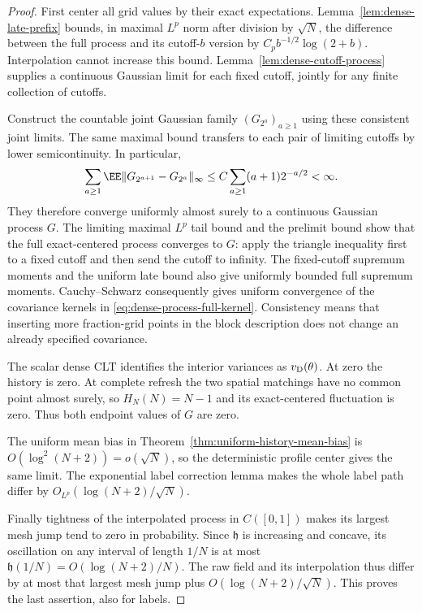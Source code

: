 \documentclass[11pt,letterpaper]{article}
\begin{document}
\begin{proof}
First center all grid values by their exact expectations.
Lemma~\ref{lem:dense-late-prefix} bounds, in maximal
$L^p$ norm after division by $\sqrt N$, the difference
between the full process and its cutoff-$b$ version by
$C_p b^{-1/2}\log(2+b)$.
Interpolation cannot increase this bound.
Lemma~\ref{lem:dense-cutoff-process} supplies a continuous
Gaussian limit for each fixed cutoff, jointly for any
finite collection of cutoffs.

Construct the countable joint Gaussian family
$(G_{2^a})_{a\ge1}$ using these consistent joint limits.
The same maximal bound transfers to each pair of
limiting cutoffs by lower semicontinuity. In particular,
\[
 \sum_{a\ge1}\EE\|G_{2^{a+1}}-G_{2^a}\|_\infty
                          \le C\sum_{a\ge1}(a+1)2^{-a/2}<\infty.
\]
They therefore converge uniformly almost surely to a
continuous Gaussian process $G$. The limiting maximal
$L^p$ tail bound and the prelimit bound show that the
full exact-centered process converges to $G$: apply the
triangle inequality first to a fixed cutoff and then
send the cutoff to infinity.
The fixed-cutoff supremum moments and the uniform late
bound also give uniformly bounded full supremum moments.
Cauchy--Schwarz consequently gives uniform convergence
of the covariance kernels in
\eqref{eq:dense-process-full-kernel}.
Consistency means that inserting more fraction-grid
points in the block description does not change an
already specified covariance.

The scalar dense CLT identifies the interior variances
as $v_{\rm D}(\theta)$. At zero the history is zero.
At complete refresh the two spatial matchings have no
common point almost surely, so $H_N(N)=N-1$ and its
exact-centered fluctuation is zero. Thus both endpoint
values of $G$ are zero.

The uniform mean bias in
Theorem~\ref{thm:uniform-history-mean-bias} is
$O(\log^2(N+2))=o(\sqrt N)$, so the deterministic profile
center gives the same limit. The exponential label
correction lemma makes the whole label path differ by
$O_{L^p}(\log(N+2)/\sqrt N)$.

Finally tightness of the interpolated process in
$C([0,1])$ makes its largest mesh jump tend to zero in
probability. Since $\mathfrak h$ is increasing and
concave, its oscillation on any interval of length $1/N$
is at most $\mathfrak h(1/N)=O(\log(N+2)/N)$.
The raw field and its interpolation thus differ by at
most that largest mesh jump plus
$O(\log(N+2)/\sqrt N)$. This proves the last assertion,
also for labels.
\end{proof}
\end{document}
